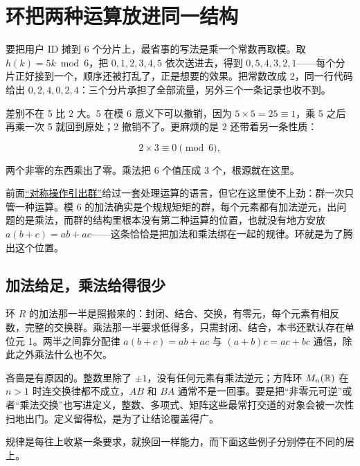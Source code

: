 \section{环把两种运算放进同一结构}
\label{sec:04-Discrete-Mathematics/08-Rings-and-Lattices/01}

要把用户 ID 摊到 6 个分片上，最省事的写法是乘一个常数再取模。取 \(h(k)=5k\bmod 6\)，把 \(0,1,2,3,4,5\) 依次送进去，得到 \(0,5,4,3,2,1\)——每个分片正好接到一个，顺序还被打乱了，正是想要的效果。把常数改成 2，同一行代码给出 \(0,2,4,0,2,4\)：三个分片承担了全部流量，另外三个一条记录也收不到。

差别不在 5 比 2 大。5 在模 6 意义下可以撤销，因为 \(5\times5=25\equiv1\)，乘 5 之后再乘一次 5 就回到原处；2 撤销不了。更麻烦的是 2 还带着另一条性质：

\[
2\times3\equiv0\pmod 6,
\]

两个非零的东西乘出了零。乘法把 6 个值压成 3 个，根源就在这里。

前面\hyperref[sec:04-Discrete-Mathematics/06-Groups-and-Symmetry/01]{``对称操作引出群''}给过一套处理运算的语言，但它在这里使不上劲：群一次只管一种运算。模 6 的加法确实是个规规矩矩的群，每个元素都有加法逆元，出问题的是乘法，而群的结构里根本没有第二种运算的位置，也就没有地方安放 \(a(b+c)=ab+ac\)——这条恰恰是把加法和乘法绑在一起的规律。环就是为了腾出这个位置。

\subsection{加法给足，乘法给得很少}

环 \(R\) 的加法那一半是照搬来的：封闭、结合、交换，有零元，每个元素有相反数，完整的交换群。乘法那一半要求低得多，只需封闭、结合，本书还默认存在单位元 1。两半之间靠分配律 \(a(b+c)=ab+ac\) 与 \((a+b)c=ac+bc\) 通信，除此之外乘法什么也不欠。

吝啬是有原因的。整数里除了 \(\pm1\)，没有任何元素有乘法逆元；方阵环 \(M_n(\mathbb{R})\) 在 \(n>1\) 时连交换律都不成立，\(AB\) 和 \(BA\) 通常不是一回事。要是把``非零元可逆''或者``乘法交换''也写进定义，整数、多项式、矩阵这些最常打交道的对象会被一次性扫地出门。定义留得松，是为了让结论覆盖得广。

规律是每往上收紧一条要求，就换回一样能力，而下面这些例子分别停在不同的层上。

